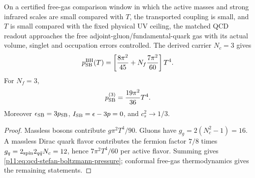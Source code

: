 \documentclass[12pt,a4paper]{article}
\begin{document}
\begin{theorem}
\label{p11:thm:native-qcd-stefan-boltzmann-limit}
On a certified free-gas comparison window in which the active masses and
strong infrared scales are small compared with $T$, the transported coupling
is small, and $T$ is small compared with the fixed physical UV ceiling,
the matched QCD readout approaches the free adjoint-gluon/fundamental-quark
gas with its actual volume, singlet and occupation errors controlled.  The derived carrier \(N_c=3\) gives
\begin{equation}
\label{p11:eq:qcd-stefan-boltzmann-pressure}
p_{\rm SB}^{\rm BH}(T)=
\left[
\frac{8\pi^2}{45}+N_f\frac{7\pi^2}{60}
\right]T^4.
\end{equation}
For \(N_f=3\),
\begin{equation}
\label{p11:eq:qcd-stefan-boltzmann-pressure-three-flavors}
p_{\rm SB}^{(3)}=\frac{19\pi^2}{36}T^4.
\end{equation}
Moreover \(\epsilon_{\rm SB}=3p_{\rm SB}\), \(I_{\rm SB}=\epsilon-3p=0\), and \(c_s^2\to1/3\).
\end{theorem}
\begin{proof}
Massless bosons contribute \(g\pi^2T^4/90\).  Gluons have \(g_g=2(N_c^2-1)=16\).  A massless Dirac quark flavor contributes the fermion factor \(7/8\) times \(g_q=2_{\rm spin}2_{q\bar q}N_c=12\), hence \(7\pi^2T^4/60\) per active flavor.  Summing gives \eqref{p11:eq:qcd-stefan-boltzmann-pressure}; conformal free-gas thermodynamics gives the remaining statements.\qedhere
\end{proof}
\end{document}
